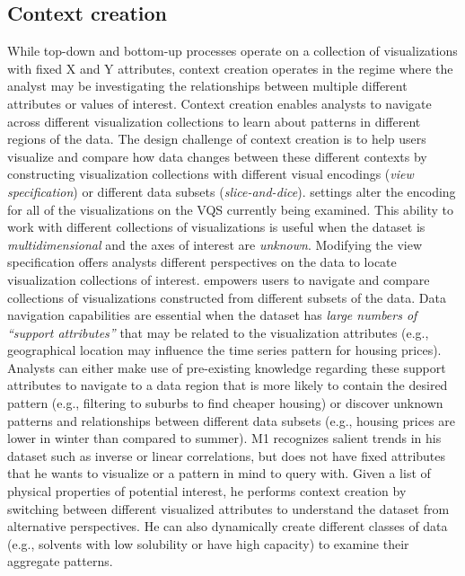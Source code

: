    \subsection{Context creation}
   While top-down and bottom-up processes operate on a collection of visualizations with fixed X and Y attributes, context creation operates in the regime where the analyst may be investigating the relationships between multiple different attributes or values of interest. Context creation enables analysts to navigate across different visualization collections to learn about patterns in different regions of the data. The design challenge of context creation is to help users visualize and compare how data changes between these different contexts by constructing visualization collections with different visual encodings (\textit{view specification}) or different data subsets (\textit{slice-and-dice}).%
    settings alter the encoding for all of the visualizations on the VQS currently being examined. This ability to work with different collections of visualizations is useful when the dataset is \emph{multidimensional} and the axes of interest are \emph{unknown}. Modifying the view specification offers analysts different perspectives on the data to locate visualization collections of interest.
    empowers users to navigate and compare collections of visualizations constructed from different subsets of the data. Data navigation capabilities are essential when the dataset has \emph{large numbers of ``support attributes''} that may be related to the visualization attributes (e.g., geographical location may influence the time series pattern for housing prices). Analysts can either make use of pre-existing knowledge regarding these support attributes to navigate to a data region that is more likely to contain the desired pattern (e.g., filtering to suburbs to find cheaper housing) or discover unknown patterns and relationships between different data subsets (e.g., housing prices are lower in winter than compared to summer).%
    M1 recognizes salient trends in his dataset such as inverse or linear correlations, but does not have fixed attributes that he wants to visualize or a pattern in mind to query with. Given a list of physical properties of potential interest, he performs context creation by switching between different visualized attributes to understand the dataset from alternative perspectives. He can also dynamically create different classes of data (e.g., solvents with low solubility or have high capacity) to examine their aggregate patterns.
